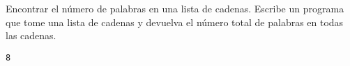 \begin{exercise}
Encontrar el número de palabras en una lista de cadenas. Escribe un
programa que tome una lista de cadenas y devuelva el número total de
palabras en todas las cadenas.

\begin{Shaded}
\begin{Highlighting}[]
 

     \NormalTok{(}\OperatorTok{+} \NormalTok{)}

\OperatorTok{=}\NormalTok{ [}\NormalTok{, }\NormalTok{, }\NormalTok{]}
\OperatorTok{=}
\end{Highlighting}
\end{Shaded}

\begin{verbatim}
8
\end{verbatim}
\end{exercise}